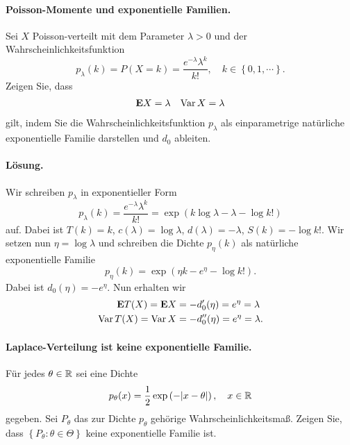 \paragraph{Poisson-Momente und exponentielle Familien.}
Sei $X$ Poisson-verteilt mit dem Parameter $\lambda>0$ und der Wahrscheinlichkeitsfunktion
\begin{equation*}
    p_{\lambda}(k)= P(X=k) = 
    \frac{e^{-\lambda} \lambda^{k} }{k!}, \quad k\in \left\{ 0,1,\cdots \right\}.
\end{equation*}
Zeigen Sie, dass 
\begin{align*}
    \mathbf{E} X = \lambda && \operatorname{Var} X = \lambda 
\end{align*}
gilt, indem Sie die Wahrscheinlichkeitsfunktion $p_{\lambda}$ 
als einparametrige natürliche exponentielle Familie darstellen und $d_0$ ableiten. 

\paragraph*{Lösung. }
Wir schreiben $p_\lambda$ in exponentieller Form
\begin{equation*}
    p_{\lambda}(k) = \frac{e^{-\lambda} \lambda^{k}}{k!} =
    \exp \left( k \log \lambda - \lambda - \log k! \right)
\end{equation*}
auf. Dabei ist $T(k) = k$, $c(\lambda)= \log \lambda$, $d(\lambda)= -\lambda$, 
$S(k) = - \log k!$. Wir setzen nun $\eta=\log \lambda$ und schreiben die Dichte 
$p_{\eta}(k)$ als natürliche exponentielle Familie
\begin{equation*}
    p_{\eta}(k) = \exp \left( \eta k - e^{\eta} - \log k! \right).
\end{equation*}
Dabei ist $d_0(\eta) = - e^{\eta}$. Nun erhalten wir 
\begin{align*}
    \mathbf{E} T(X) = \mathbf{E} X &= - d_0'(\eta) = e^{\eta} = \lambda \\
    \operatorname{Var} T(X) = \operatorname{Var} X &= -d_0''(\eta) = e^{\eta} = \lambda.
\end{align*}




\paragraph{Laplace-Verteilung ist keine exponentielle Familie.}
Für jedes $\theta\in\mathbb R$ sei eine Dichte
\begin{equation*} 
    p_\theta(x) = \frac{1}{2} \exp\left( -| x-\theta| \right), \quad x\in\mathbb R
\end{equation*}
gegeben. Sei $P_\theta$ das zur Dichte $p_\theta$ gehörige
Wahrscheinlichkeitsmaß.  Zeigen Sie, dass $\left\{ P_\theta : \theta\in\Theta
\right\}$ keine exponentielle Familie ist.


